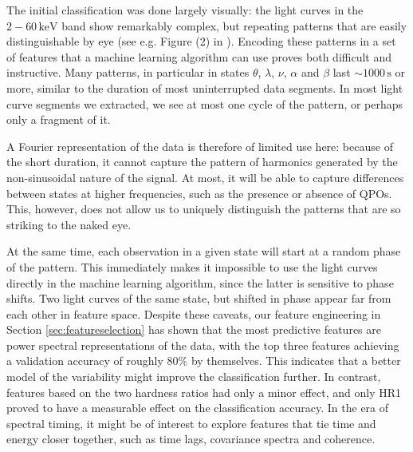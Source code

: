 \documentclass[fleqn,usenatbib]{mnras}
\begin{document}
The initial classification was done largely visually: the light curves in the $2-60\,\mathrm{keV}$ band show remarkably complex, but repeating patterns that are 
easily distinguishable by eye (see e.g. Figure (2) in \citealt{belloni2000}). Encoding these patterns in a set of features that a machine learning algorithm can use proves both difficult and instructive.
Many patterns, in particular in states $\theta$, $\lambda$, $\nu$, $\alpha$ and $\beta$ last $\sim 1000\,\mathrm{s}$ or more, similar to the duration of most 
uninterrupted data segments.
In most light curve segments we extracted, we see at most one cycle of the pattern, or perhaps only a fragment of it.

A Fourier representation of the data is therefore of limited use here: because of the short duration, it cannot capture the pattern of harmonics generated by the non-sinusoidal nature of the signal.
At most, it will be able to capture differences between states at higher frequencies, such as the presence or absence of QPOs.
This, however, does not allow us to uniquely distinguish the patterns that are so striking to the naked eye. 

At the same time, each observation in a given state will start at a random phase of the pattern. This immediately makes it impossible to use the light curves directly 
in the machine learning algorithm, since the latter is sensitive to phase shifts. Two light curves of the same state, but shifted in phase appear far 
from each other in feature space. Despite these caveats, our feature engineering in Section \ref{sec:featureselection} has shown that 
the most predictive features are power spectral representations of the data, with the top three features achieving a validation accuracy of roughly $80\%$ by themselves.
This indicates that a better 
model of the variability might improve the classification further. In contrast, features based on the two hardness ratios had only a minor effect, and only HR1 proved 
to have a measurable effect on the classification accuracy. In the era of spectral timing, it might be of interest to explore features that tie time and energy closer 
together, such as time lags, covariance spectra and coherence.
\end{document}
